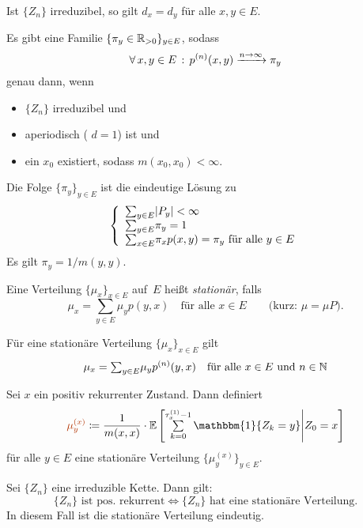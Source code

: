 \documentclass{cheat-sheet}
\newcommand{\E}{\mathbb{E}} %
\newcommand{\ind}{\mathbbm{1}} %
\newcommand{\Defn}[1]{\textcolor{DefinitionColor}{#1}}
\begin{document}
\begin{lem}
  Ist $\{ Z_n \}$ irreduzibel, so gilt $d_x = d_y$ für alle $x, y \in E$.
\end{lem}

\begin{satz}
  Es gibt eine Familie $\{ \pi_y \in \mathbb{R}_{> 0} \}_{y \in E}$, sodass
  \[ \forall \, {x, y \in E} \,:\, p^{(n)}(x, y) \xrightarrow{n \to \infty} \pi_y \]
  genau dann, wenn
  \begin{itemize}
    \item $\{ Z_n \}$ irreduzibel und
    \item aperiodisch (\dh{} $d = 1$) ist und
    \item ein $x_0$ existiert, sodass $m(x_0, x_0) < \infty$.
  \end{itemize}
  Die Folge $\{ \pi_y \}_{y \in E}$ ist die eindeutige Lösung zu
  \[
    \left\{
      \begin{array}{l}
        {\sum}_{y \in E} \abs{P_y} < \infty \\
        {\sum}_{y \in E} \pi_y = 1 \\
        {\sum}_{x \in E} \pi_x p(x, y) = \pi_y \text{ für alle } y \in E
      \end{array}
    \right.
  \]
  Es gilt $\pi_y = 1/m(y,y)$.
\end{satz}


\begin{defn}
  Eine Verteilung $\{ \mu_x \}_{x \in E}$ auf~$E$ heißt \emph{stationär}, falls
  \[
    \mu_x = {\sum}_{y \in E} \mu_y p(y, x)
    \quad \text{für alle $x \in E$}
    \qquad \text{(kurz: $\mu = \mu P$).}
  \]
\end{defn}

\begin{bem}
  Für eine stationäre Verteilung $\{ \mu_x \}_{x \in E}$ gilt
  \[
    \mu_x = {\sum}_{y \in E} \mu_y p^{(n)}(y, x)
    \quad \text{für alle $x \in E$ und $n \in \N$}
  \]
\end{bem}

\begin{lem}
  Sei $x$ ein positiv rekurrenter Zustand.
  Dann definiert
  \[
    \Defn{\mu_y^{(x)}} \coloneqq \frac{1}{m(x, x)} \cdot \E \left[ \sum_{k=0}^{\tau_x^{(1)} - 1} \ind \{ Z_k = y \} \middle| Z_0 = x \right]
  \]
  für alle $y \in E$ eine stationäre Verteilung $\{ \mu_y^{(x)} \}_{y \in E}$.
\end{lem}

\begin{satz}
  Sei $\{ Z_n \}$ eine irreduzible Kette.
  Dann gilt:
  \[
    \{ Z_n \} \text{ ist pos. rekurrent} \iff
    \{ Z_n \} \text{ hat eine stationäre Verteilung.}
  \]
  In diesem Fall ist die stationäre Verteilung eindeutig.
\end{satz}
\end{document}
